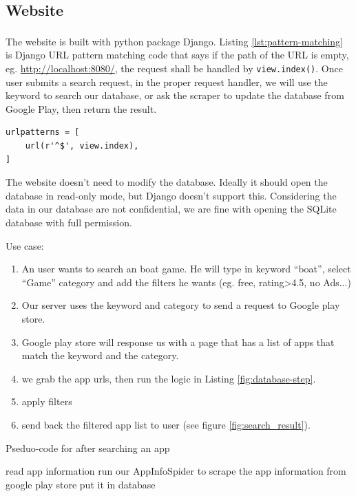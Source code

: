 \documentclass[12pt, a4paper]{article}
\newcommand{\code}[1]{\texttt{#1}}
\begin{document}
\subsection{Website}
The website is built with python package Django\textsuperscript{\cite{django}}. Listing \ref{lst:pattern-matching} is Django URL pattern matching code that says if the path of the URL is empty, eg. \url{http://localhost:8080/}, the request shall be handled by \code{view.index()}. Once user submits a search request, in the proper request handler, we will use the keyword to search our database, or ask the scraper to update the database from Google Play, then return the result.

\begin{lstlisting}[frame=tb, caption=urls.py, label=lst:pattern-matching]
urlpatterns = [
    url(r'^$', view.index),
]
\end{lstlisting}

The website doesn't need to modify the database. Ideally it should open the database in read-only mode, but Django doesn't support this. Considering the data in our database are not confidential, we are fine with opening the SQLite database with full permission.



Use case:

\begin{enumerate}
    \item An user wants to search an boat game. He will type in keyword “boat”, select “Game” category and add the filters he wants (eg. free, rating>4.5, no Ads...)
    \item Our server uses the keyword and category to send a request to Google play store.
    \item Google play store will response us with a page that has a list of apps that match the keyword and the category. 
    \item we grab the app urls, then run the logic in Listing \ref{fig:database-step}.
    \item apply filters
    \item send back the filtered app list to user (see figure  \ref{fig:search_result}).
\end{enumerate}

\begin{algorithm}
    \caption{Pseduo-code for after searching an app}
    \label{fig:database-step}
\begin{algorithmic}
    \STATE read app information
    \ELSE
    \STATE run our AppInfoSpider to scrape the app information from google play store
    \STATE put it in database
    \ENDIF
    \ENDFOR
\end{algorithmic}
\end{algorithm}
    
\end{document}
